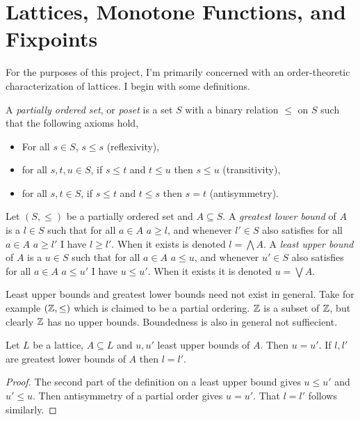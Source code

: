 \section{Lattices, Monotone Functions, and Fixpoints}
For the purposes of this project, I'm primarily concerned with an order-theoretic characterization of lattices.
I begin with some definitions.
\begin{definition}[Poset]\label{posetdef}
  A \emph{partially ordered set}, or \emph{poset} is a set $S$ with a binary relation $\leq$ on $S$ such that the following axioms hold,
  \begin{itemize}
    \item For all $s \in S$, $s \leq s$ (reflexivity),
    \item for all $s, t, u \in S$, if $s \leq t$ and $t \leq u$ then $s \leq u$ (transitivity),
    \item for all $s, t \in S$, if $s \leq t$ and $t \leq s$ then $s = t$ (antisymmetry).
  \end{itemize}
\end{definition}
\begin{definition}
  Let $(S, \leq)$ be a partially ordered set and $A \subseteq S$. A \emph{greatest lower bound} of $A$ is
  a $l \in S$ such that for all $a \in A$ $a \geq l$, and whenever $l' \in S$ also satisfies for all $a \in A$
  $a \geq l'$ I have $l \geq l'$. When it exists is denoted $l = \bigwedge A$. 
  A \emph{least upper bound} of $A$ is a $u \in S$ such that for all $a \in A$ $a \leq u$, and whenever $u' \in S$ also satisfies for all $a \in A$
  $a \leq u'$ I have $u \leq u'$. When it exists it is denoted $u = \bigvee A$.
\end{definition}
\begin{remark}
  Least upper bounds and greatest lower bounds need not exist in general. Take for example $(\mathbb{Z}, \leq)$ which
  is claimed to be a partial ordering. $\mathbb{Z}$ is a subset of $\mathbb{Z}$, but clearly $\mathbb{Z}$ has no upper bounds.
  Boundedness is also in general not suffiecient. 
\end{remark}
\begin{lemma}
  Let $L$ be a lattice, $A \subseteq L$ and $u, u'$ least upper bounds of $A$. Then $u = u'$.
  If $l, l'$ are greatest lower bounds of $A$ then $l = l'$.
\end{lemma}
\begin{proof}
  The second part of the definition on a least upper bound gives $u \leq u'$ and $u' \leq u$. Then
  antisymmetry of a partial order gives $u = u'$. That $l = l'$ follows similarly.
\end{proof}
